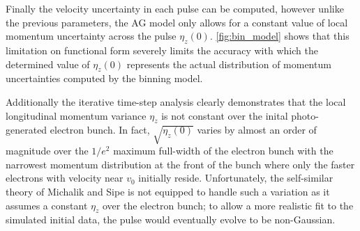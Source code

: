 
Finally the velocity uncertainty in each pulse can be computed, however unlike the previous parameters, the AG model only allows for a constant value of local momentum uncertainty across the pulse $\eta_z(0)$.
\ref{fig:bin_model} shows that this limitation on functional form severely limits the accuracy with which the determined value of $\eta_z(0)$ represents the actual distribution of momentum uncertainties computed by the binning model.

Additionally the iterative time-step analysis clearly demonstrates that the local longitudinal momentum variance $ \eta_{ z } $ is not constant over the inital photo-generated electron bunch.
In fact, $ \sqrt{ \eta_{ z } ( 0 ) } $ varies by almost an order of magnitude over the $ 1/e^{2} $ maximum full-width of the electron bunch with the narrowest momentum distribution at the front of the bunch where only the faster electrons with velocity near $ v_{ 0 } $ initially reside.
Unfortunately, the self-similar theory of Michalik and Sipe \cite{michalik_analytic_2006} is not equipped to handle such a variation as it assumes a constant $ \eta_{ z } $ over the electron bunch; to allow a more realistic fit to the simulated initial data, the pulse would eventually evolve to be non-Gaussian.


